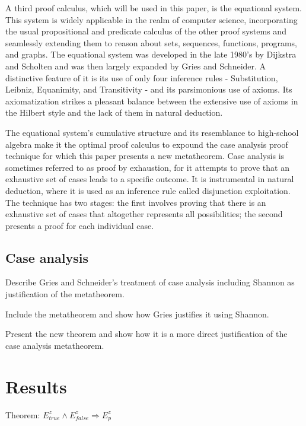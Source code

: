 \documentclass[12pt, fleqn, leqno]{article}
\newcommand{\impl}{\ensuremath{\Rightarrow}}        %
\begin{document}
A third proof calculus, which will be used in this paper, is the equational system. This system is widely applicable in the realm of computer science, incorporating the usual propositional and predicate calculus of the other proof systems and seamlessly extending them to reason about sets, sequences, functions, programs, and graphs. The equational system was developed in the late 1980’s by Dijkstra and Scholten and was then largely expanded by Gries and Schneider. A distinctive feature of it is its use of only four inference rules - Substitution, Leibniz, Equanimity, and Transitivity - and its parsimonious use of axioms. Its axiomatization strikes a pleasant balance between the extensive use of axioms in the Hilbert style and the lack of them in natural deduction.

The equational system’s cumulative structure and its resemblance to high-school algebra make it the optimal proof calculus to expound the case analysis proof technique for which this paper presents a new metatheorem. Case analysis is sometimes referred to as proof by exhaustion, for it attempts to prove that an exhaustive set of cases leads to a specific outcome. It is instrumental in natural deduction, where it is used as an inference rule called disjunction exploitation. The technique has two stages: the first involves proving that there is an exhaustive set of cases that altogether represents all possibilities; the second presents a proof for each individual case.

\subsection{Case analysis}

Describe Gries and Schneider's treatment of case analysis including Shannon as justification of the metatheorem.

Include the metatheorem and show how Gries justifies it using Shannon. 

Present the new theorem and show how it is a more direct justification of the case analysis metatheorem.

\section{Results}

Theorem: $E^{z}_{true}\land E^{z}_{false} \impl E^{z}_{p}$
\end{document}
